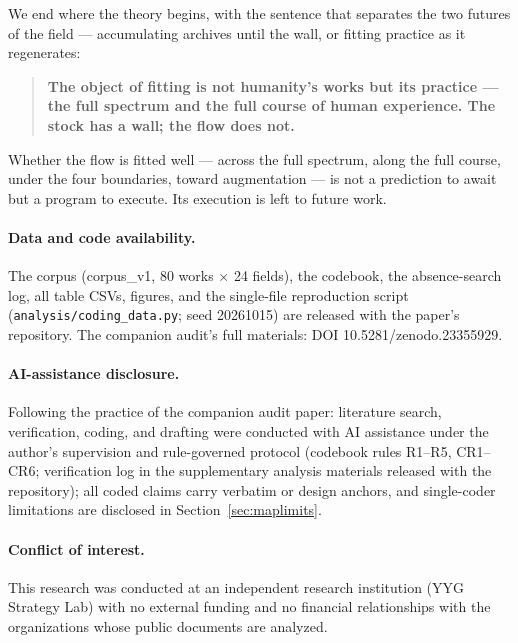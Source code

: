 \documentclass[10pt]{article}
\begin{document}
We end where the theory begins, with the sentence that separates the two futures of the field --- accumulating archives until the wall, or fitting practice as it regenerates:

\begin{quote}
\textbf{The object of fitting is not humanity's works but its practice --- the full spectrum and the full course of human experience. The stock has a wall; the flow does not.}
\end{quote}

Whether the flow is fitted well --- across the full spectrum, along the full course, under the four boundaries, toward augmentation --- is not a prediction to await but a program to execute. Its execution is left to future work.

\medskip
\paragraph{Data and code availability.}
The corpus (corpus\_v1, 80 works $\times$ 24 fields), the codebook, the absence-search log, all table CSVs, figures, and the single-file reproduction script (\texttt{analysis/coding\_data.py}; seed 20261015) are released with the paper's repository.
The companion audit's full materials: DOI 10.5281/zenodo.23355929.

\paragraph{AI-assistance disclosure.}
Following the practice of the companion audit paper: literature search, verification, coding, and drafting were conducted with AI assistance under the author's supervision and rule-governed protocol (codebook rules R1--R5, CR1--CR6; verification log in the supplementary analysis materials released with the repository); all coded claims carry verbatim or design anchors, and single-coder limitations are disclosed in Section~\ref{sec:maplimits}.

\paragraph{Conflict of interest.}
This research was conducted at an independent research institution (YYG Strategy Lab) with no external funding and no financial relationships with the organizations whose public documents are analyzed.
\end{document}

